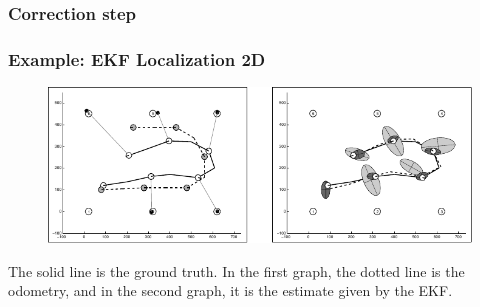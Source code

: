     \begin{frame}
    \frametitle{Correction step}
    
    \begin{figure}[!h]
    \centering
    \end{figure}
    
    \end{frame}
    
    \begin{frame}
    \frametitle{Example: EKF Localization 2D}
    
    \begin{figure}[!h]
    \includegraphics[width=\columnwidth]{./images/ekf_localization_example.pdf}
    \end{figure}
    
    The solid line is the ground truth. In the first graph, the dotted line is the odometry, and in the second graph, it is the estimate given by the EKF.
    
\end{frame}
    

